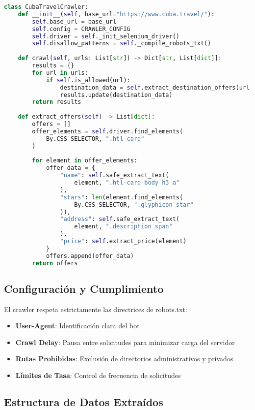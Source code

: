 \documentclass[runningheads]{llncs}
\begin{document}
\begin{lstlisting}[language=Python, caption=Clase principal del crawler]
class CubaTravelCrawler:
    def __init__(self, base_url="https://www.cuba.travel/"):
        self.base_url = base_url
        self.config = CRAWLER_CONFIG
        self.driver = self._init_selenium_driver()
        self.disallow_patterns = self._compile_robots_txt()
        
    def crawl(self, urls: List[str]) -> Dict[str, List[dict]]:
        results = {}
        for url in urls:
            if self.is_allowed(url):
                destination_data = self.extract_destination_offers(url)
                results.update(destination_data)
        return results
        
    def extract_offers(self) -> List[dict]:
        offers = []
        offer_elements = self.driver.find_elements(
            By.CSS_SELECTOR, ".htl-card"
        )
        
        for element in offer_elements:
            offer_data = {
                "name": self.safe_extract_text(
                    element, ".htl-card-body h3 a"
                ),
                "stars": len(element.find_elements(
                    By.CSS_SELECTOR, ".glyphicon-star"
                )),
                "address": self.safe_extract_text(
                    element, ".description span"
                ),
                "price": self.extract_price(element)
            }
            offers.append(offer_data)
        return offers
\end{lstlisting}

\subsection{Configuración y Cumplimiento}

El crawler respeta estrictamente las directrices de robots.txt:

\begin{itemize}
\item \textbf{User-Agent}: Identificación clara del bot
\item \textbf{Crawl Delay}: Pausa entre solicitudes para minimizar carga del servidor
\item \textbf{Rutas Prohibidas}: Exclusión de directorios administrativos y privados
\item \textbf{Límites de Tasa}: Control de frecuencia de solicitudes
\end{itemize}

\subsection{Estructura de Datos Extraídos}
\end{document}
